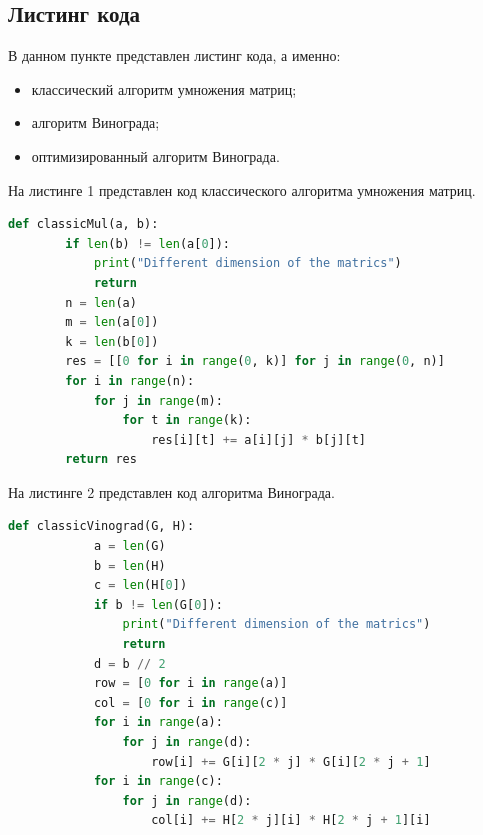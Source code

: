 \documentclass[a4paper, 12pt]{article}
\begin{document}
\begin{flushleft}
	\subsection{Листинг кода}
	В данном пункте представлен листинг кода, а именно:
	\begin{itemize}
		\item классический алгоритм умножения матриц;
		\item алгоритм Винограда;
		\item оптимизированный алгоритм Винограда.
	\end{itemize}


	\lstset{style=mystyle}

	\hspace*{5mm} На листинге 1 представлен код классического алгоритма умножения матриц.
	\begin{lstlisting}[language=Python, caption = Классический алгоритм умножения матриц]
	def classicMul(a, b):
		if len(b) != len(a[0]):
			print("Different dimension of the matrics")
			return
		n = len(a)
		m = len(a[0])
		k = len(b[0])
		res = [[0 for i in range(0, k)] for j in range(0, n)]
		for i in range(n):
			for j in range(m):
				for t in range(k):
					res[i][t] += a[i][j] * b[j][t]
		return res
	\end{lstlisting}
	\clearpage
	\newpage
	\hspace*{5mm} На листинге 2 представлен код алгоритма Винограда.
	\begin{lstlisting}[language=Python, caption = Алгоритм Винограда]
		def classicVinograd(G, H):
			a = len(G)
			b = len(H)
			c = len(H[0])
			if b != len(G[0]):
				print("Different dimension of the matrics")
				return
			d = b // 2
			row = [0 for i in range(a)]
			col = [0 for i in range(c)]
			for i in range(a):
				for j in range(d):
					row[i] += G[i][2 * j] * G[i][2 * j + 1]
			for i in range(c):
				for j in range(d):
					col[i] += H[2 * j][i] * H[2 * j + 1][i]
		

\end{lstlisting}
\end{flushleft}
\end{document}
